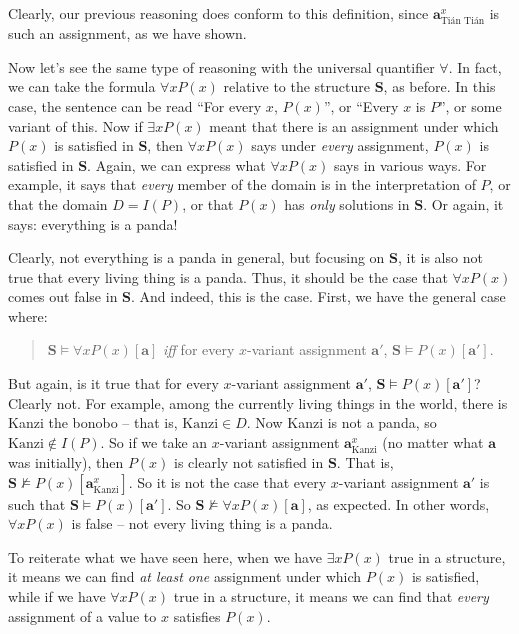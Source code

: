Clearly, our previous reasoning does conform to this definition, since $\mathbf{a}^x_\text{Tián Tián}$ is such an assignment, as we have shown. 

Now let's see the same type of reasoning with the universal quantifier $\forall$. In fact, we can take the formula $\forall x P(x)$ relative to the structure $\mathbf{S}$, as before. In this case, the sentence can be read ``For every $x$, $P(x)$'', or ``Every $x$ is $P$'', or some variant of this. Now if $\exists x P(x)$ meant that there is an assignment under which $P(x)$ is satisfied in $\mathbf{S}$, then $\forall x P(x)$ says under \textit{every} assignment, $P(x)$ is satisfied in $\mathbf{S}$. Again, we can express what $\forall x P(x)$ says in various ways. For example, it says that \textit{every} member of the domain is in the interpretation of $P$, or that the domain $D=I(P)$, or that $P(x)$ has \textit{only} solutions in $\mathbf{S}$. Or again, it says: everything is a panda!

Clearly, not everything is a panda in general, but focusing on $\mathbf{S}$, it is also not true that every living thing is a panda. Thus, it should be the case that $\forall x P(x)$ comes out false in $\mathbf{S}$. And indeed, this is the case. First, we have the general case where:

\begin{quote}
	$\mathbf{S} \models \forall x P(x)[\mathbf{a}]$ \textit{iff} for every $x$-variant assignment $\mathbf{a}'$, $\mathbf{S} \models P(x)[\mathbf{a}']$. 
\end{quote}

But again, is it true that for every $x$-variant assignment $\mathbf{a}'$, $\mathbf{S} \models P(x)[\mathbf{a}']$? Clearly not. For example, among the currently living things in the world, there is Kanzi the bonobo -- that is, $\text{Kanzi} \in D$. Now Kanzi is not a panda, so $\text{Kanzi} \notin I(P)$. So if we take an $x$-variant assignment $\mathbf{a}^x_\text{Kanzi}$ (no matter what $\mathbf{a}$ was initially), then $P(x)$ is clearly not satisfied in $\mathbf{S}$. That is, $\mathbf{S} \not\models P(x)[\mathbf{a}^x_\text{Kanzi}]$. So it is not the case that every $x$-variant assignment $\mathbf{a}'$ is such that $\mathbf{S} \models P(x)[\mathbf{a}']$. So 	$\mathbf{S} \not\models \forall x P(x)[\mathbf{a}]$, as expected. In other words, $\forall x P(x)$ is false -- not every living thing is a panda. 

To reiterate what we have seen here, when we have $\exists x P(x)$ true in a structure, it means we can find \textit{at least one} assignment under which $P(x)$ is satisfied, while if we have $\forall x P(x)$ true in a structure, it means we can find that \textit{every} assignment of a value to $x$ satisfies $P(x)$. 

